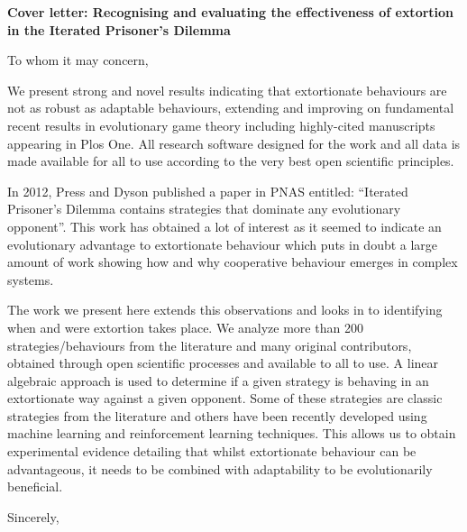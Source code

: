 \documentclass[11pt]{letter}
\begin{document}
\signature{The authors}

\begin{letter}{}

\textbf{Cover letter: Recognising and evaluating the effectiveness
       of extortion in the Iterated Prisoner's Dilemma}

To whom it may concern,

We present strong and novel results indicating that extortionate behaviours are
not as robust as adaptable behaviours, extending and improving on fundamental
recent results in evolutionary game theory including highly-cited manuscripts
appearing in Plos One. All research software designed for the work
and all data is made available for all to use according to the very best open
scientific principles.

In 2012, Press and Dyson published a paper in PNAS entitled: ``Iterated
Prisoner’s Dilemma contains strategies that dominate any evolutionary
opponent''. This work has obtained a lot of interest as it seemed to indicate an
evolutionary advantage to extortionate behaviour which puts in doubt a
large amount of work showing how and why cooperative behaviour emerges in
complex systems.

The work we present here extends this observations and looks in to identifying
when and were extortion takes place.
We analyze more than 200 strategies/behaviours from the literature and
many original contributors, obtained through open scientific processes and
available to all to use. A linear algebraic approach is used to determine if a
given strategy is behaving in an extortionate way against a given opponent. Some
of these strategies are classic strategies from the literature and others have
been recently developed using machine learning and reinforcement learning
techniques. This allows us to obtain experimental evidence detailing that whilst
extortionate behaviour can be advantageous, it needs to be combined with
adaptability to be evolutionarily beneficial.

\closing{Sincerely,}

\end{letter}
\end{document}
